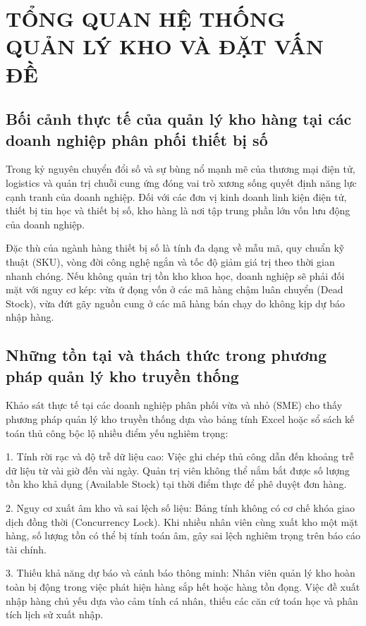 \chapter{TỔNG QUAN HỆ THỐNG QUẢN LÝ KHO VÀ ĐẶT VẤN ĐỀ}

\section{Bối cảnh thực tế của quản lý kho hàng tại các doanh nghiệp phân phối thiết bị số}

Trong kỷ nguyên chuyển đổi số và sự bùng nổ mạnh mẽ của thương mại điện tử, logistics và quản trị chuỗi cung ứng đóng vai trò xương sống quyết định năng lực cạnh tranh của doanh nghiệp. Đối với các đơn vị kinh doanh linh kiện điện tử, thiết bị tin học và thiết bị số, kho hàng là nơi tập trung phần lớn vốn lưu động của doanh nghiệp.

Đặc thù của ngành hàng thiết bị số là tính đa dạng về mẫu mã, quy chuẩn kỹ thuật (SKU), vòng đời công nghệ ngắn và tốc độ giảm giá trị theo thời gian nhanh chóng. Nếu không quản trị tồn kho khoa học, doanh nghiệp sẽ phải đối mặt với nguy cơ kép: vừa ứ đọng vốn ở các mã hàng chậm luân chuyển (Dead Stock), vừa đứt gãy nguồn cung ở các mã hàng bán chạy do không kịp dự báo nhập hàng.

\section{Những tồn tại và thách thức trong phương pháp quản lý kho truyền thống}

Khảo sát thực tế tại các doanh nghiệp phân phối vừa và nhỏ (SME) cho thấy phương pháp quản lý kho truyền thống dựa vào bảng tính Excel hoặc sổ sách kế toán thủ công bộc lộ nhiều điểm yếu nghiêm trọng:

1. Tính rời rạc và độ trễ dữ liệu cao: Việc ghi chép thủ công dẫn đến khoảng trễ dữ liệu từ vài giờ đến vài ngày. Quản trị viên không thể nắm bắt được số lượng tồn kho khả dụng (Available Stock) tại thời điểm thực để phê duyệt đơn hàng.

2. Nguy cơ xuất âm kho và sai lệch số liệu: Bảng tính không có cơ chế khóa giao dịch đồng thời (Concurrency Lock). Khi nhiều nhân viên cùng xuất kho một mặt hàng, số lượng tồn có thể bị tính toán âm, gây sai lệch nghiêm trọng trên báo cáo tài chính.

3. Thiếu khả năng dự báo và cảnh báo thông minh: Nhân viên quản lý kho hoàn toàn bị động trong việc phát hiện hàng sắp hết hoặc hàng tồn đọng. Việc đề xuất nhập hàng chủ yếu dựa vào cảm tính cá nhân, thiếu các căn cứ toán học và phân tích lịch sử xuất nhập.

